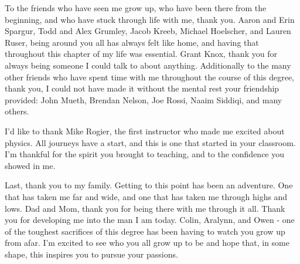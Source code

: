 To the friends who have seen me grow up, who have been there from the beginning, and who have stuck through life with me, thank you. Aaron and Erin Spargur, Todd and Alex Grumley, Jacob Kreeb, Michael Hoelscher, and Lauren Ruser, being around you all has always felt like home, and having that throughout this chapter of my life was essential. Grant Knox, thank you for always being someone I could talk to about anything. Additionally to the many other friends who have spent time with me throughout the course of this degree, thank you, I could not have made it without the mental rest your friendship provided: John Mueth, Brendan Nelson, Joe Rossi, Naaim Siddiqi, and many others.

I'd like to thank Mike Rogier, the first instructor who made me excited about physics. All journeys have a start, and this is one that started in your classroom. I'm thankful for the spirit you brought to teaching, and to the confidence you showed in me. 

Last, thank you to my family. Getting to this point has been an adventure. One that has taken me far and wide, and one that has taken me through highs and lows. Dad and Mom, thank you for being there with me through it all. Thank you for developing me into the man I am today. Colin, Aralynn, and Owen - one of the toughest sacrifices of this degree has been having to watch you grow up from afar. I'm excited to see who you all grow up to be and hope that, in some shape, this inspires you to pursue your passions.
\\


